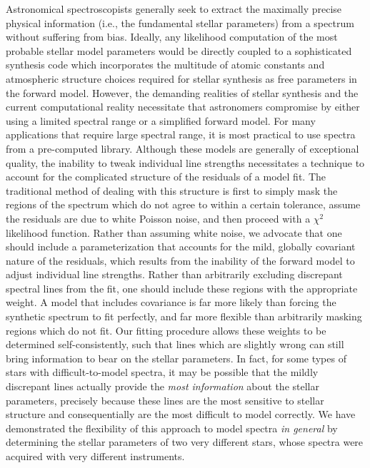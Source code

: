 \documentclass[iop,floatfix]{emulateapj}
\begin{document}
Astronomical spectroscopists generally seek to extract the maximally precise physical information (i.e., the fundamental stellar parameters) from a spectrum without suffering from bias. Ideally, any likelihood computation of the most probable stellar model parameters would be directly coupled to a sophisticated synthesis code which incorporates the multitude of atomic constants and atmospheric structure choices required for stellar synthesis as free parameters in the forward model. However, the demanding realities of stellar synthesis and the current computational reality necessitate that astronomers compromise by either using a limited spectral range or a simplified forward model. For many applications that require large spectral range, it is most practical to use spectra from a pre-computed library. Although these models are generally of exceptional quality, the inability to tweak individual line strengths necessitates a technique to account for the complicated structure of the residuals of a model fit. The traditional method of dealing with this structure is first to simply mask the regions of the spectrum which do not agree to within a certain tolerance, assume the residuals are due to white Poisson noise, and then proceed with a $\chi^2$ likelihood function. Rather than assuming white noise, we advocate that one should include a parameterization that accounts for the mild, globally covariant nature of the residuals, which results from the inability of the forward model to adjust individual line strengths. Rather than arbitrarily excluding discrepant spectral lines from the fit, one should include these regions with the appropriate weight. A model that includes covariance is far more likely than forcing the synthetic spectrum to fit perfectly, and far more flexible than arbitrarily masking regions which do not fit. Our fitting procedure allows these weights to be determined self-consistently, such that lines which are slightly wrong can still bring information to bear on the stellar parameters. In fact, for some types of stars with difficult-to-model spectra, it may be possible that the mildly discrepant lines actually provide the \emph{most information} about the stellar parameters, precisely because these lines are the most sensitive to stellar structure and consequentially are the most difficult to model correctly. We have demonstrated the flexibility of this approach to model spectra \emph{in general} by determining the stellar parameters of two very different stars, whose spectra were acquired with very different instruments. 
\end{document}
